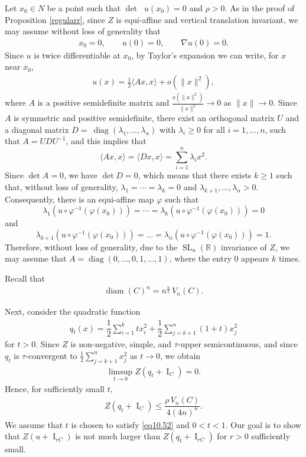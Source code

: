 \documentclass[11pt]{article}
\theoremstyle{definition} %
\DeclareMathOperator{\V}{SL}
\newcommand{\N}{_n(\mathbb{R})}
\DeclareMathOperator{\I}{I}
\DeclareMathOperator{\D}{D^2}
\DeclareMathOperator{\diag}{diag}
\DeclareMathOperator{\diam}{diam}
\begin{document}
Let $x_0\in N$ be a point such that $\det \D u(x_0)=0$ and $\rho>0$. As in the proof of Proposition \ref{regularr}, since $Z$ is  equi-affine and vertical translation invariant, we may assume without loss of generality that
\begin{align}\label{assump}
 x_0 = 0, \qquad u(0) = 0, \qquad \nabla u(0) = 0.   
\end{align}
Since $u$  is twice differentiable at $x_0$, by Taylor's expansion we can write, for $x$ near $x_0$,
\begin{align*}
    u(x)=\frac{1}{2}\langle Ax, x\rangle + o(\|x\|^2),
\end{align*}
where $A$ is a  positive semidefinite   matrix and $\frac{o(\|x\|^2)}{\|x\|^2}\rightarrow 0$ as $\|x\|\rightarrow 0$.
Since $A$ is symmetric and positive semidefinite, there exist an orthogonal matrix $U$ and a diagonal matrix  $D=~\diag(\lambda_1, \dots, \lambda_n)$ with $\lambda_i\geq 0$ for all $i=1,\dots, n$, such that $A= U DU^{-1}$, and this implies that
$$\langle A x, x\rangle = \langle Dx, x\rangle= \sum_{i=1}^n \lambda_ix^2.$$
Since $\det A = 0$, we have $\det D = 0$, which means that there exists $k\geq 1$ such that, without loss of generality, $\lambda_1= \cdots = \lambda_k=0$ and $\lambda_{k+1}, \dots, \lambda_n>0$. Consequently, there is an equi-affine map $\varphi$ such that  
$$
\lambda_1( u\circ \varphi^{-1}(\varphi(x_0)))= \cdots =\lambda_k( u\circ \varphi^{-1}(\varphi(x_0)))=0
$$
and 
$$
\lambda_{k+1}( u\circ \varphi^{-1}(\varphi(x_0)))= \dots = \lambda_{n}( u\circ \varphi^{-1}(\varphi(x_0)))=1.
$$
Therefore, without loss of generality, due to the $\V\N$ invariance of $Z$, we may assume that  $A=\diag(0,\dots, 0, 1, \dots, 1)$, where the entry $0$ appears $k$ times.


Recall that 
\begin{align}\label{eq10.53.}
   \diam(C)^n= n^{\frac{n}{2}}\, V_n(C).
\end{align}

 

Next, consider the quadratic function 
\begin{align*}
   q_t(x)= \dfrac{1}{2}\sum_{i=1}^k tx_i^2+\dfrac{1}{2}\sum_{j=k+1}^n(1+t)x_j^2 
\end{align*}
for $t>0$. Since $Z$ is  non-negative, simple,  and  $\tau$-upper semicontinuous, and since $q_t$ is $\tau$-convergent  to $\frac{1}{2}\sum_{j=k+1}^nx_j^2$ as $t\rightarrow 0$, we obtain
\begin{align*}
    \limsup_{t\rightarrow 0} Z(q_t+\I_C)=0.
\end{align*}
Hence, for sufficiently small $t$,
\begin{align}\label{eq10.52}
Z(q_t+\I_C)\le \dfrac{\rho \, V_n(C)}{4(4n)^n}.    
\end{align}
We assume that $t$ is chosen to satisfy \eqref{eq10.52}  and $0 < t < 1$. Our goal is to show that $Z(u+\I_{rC})$ is not much larger than $Z(q_t+\I_{rC})$ for $r>0$ sufficiently small.
\end{document}
